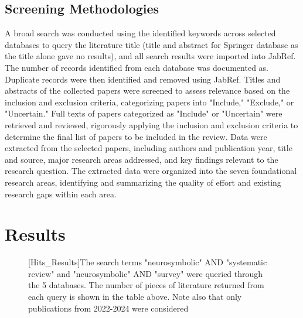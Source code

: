 \documentclass[journal]{IEEEtran}
\begin{document}
\subsection{Screening Methodologies}
A broad search was conducted using the identified keywords across selected databases to query the literature title (title and abstract for Springer database as the title alone gave no results), and all search results were imported into JabRef. The number of records identified from each database was documented as. Duplicate records were then identified and removed using JabRef. Titles and abstracts of the collected papers were screened to assess relevance based on the inclusion and exclusion criteria, categorizing papers into "Include," "Exclude," or "Uncertain." Full texts of papers categorized as "Include" or "Uncertain" were retrieved and reviewed, rigorously applying the inclusion and exclusion criteria to determine the final list of papers to be included in the review. Data were extracted from the selected papers, including authors and publication year, title and source, major research areas addressed, and key findings relevant to the research question. The extracted data were organized into the seven foundational research areas, identifying and summarizing the quality of effort and existing research gaps within each area.

\section{Results}\label{sec:results}

\begin{figure}[ht]
    \centering

[Hits_Results]{The search terms "neurosymbolic" AND "systematic review" and "neurosymbolic" AND "survey" were queried through the 5 databases. The number of pieces of literature returned from each query is shown in the table above. Note also that only publications from 2022-2024 were considered}
\label{tab::hits_results}
\end{figure}
\end{document}
